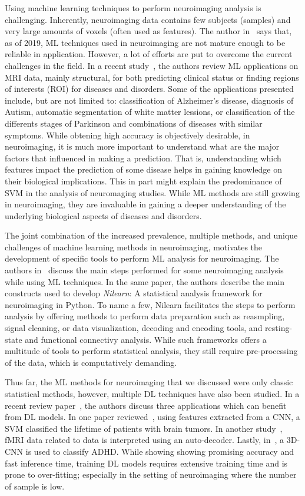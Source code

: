 Using machine learning techniques to perform neuroimaging analysis is challenging.
Inherently, neuroimaging data contains few subjects (samples) and very large amounts
of voxels (often used as features).
The author in~\cite{Davatzikos2019-dc} says that, as of 2019, ML techniques used in
neuroimaging are not mature enough to be reliable in application.
However, a lot of efforts are put to overcome the current challenges in the field.
In a recent study~\cite{Mateos-Perez2018-wx}, the authors review ML applications on MRI data,
mainly structural, for both predicting clinical status or finding regions of interests (ROI)
for diseases and disorders.
Some of the applications presented include, but are not limited to: 
classification of Alzheimer's disease, diagnosis of Autism, automatic segmentation
of white matter lessions, or classification of the differents stages of Parkinson
and combinations of diseases with similar symptoms.
While obtening high accuracy is objectively desirable, in neuroimaging, it is much
more important to understand what are the major factors that influenced in making a prediction.
That is, understanding which features impact the prediction of some disease helps
in gaining knowledge on their biological implications.
This in part might explain the predominance of SVM in the analysis of neuromaging studies.
While ML methods are still growing in neuroimaging, they are invaluable in gaining 
a deeper understanding of the underlying biological aspects of diseases and disorders.

The joint combination of the increased prevalence, multiple methods, and unique 
challenges of machine learning methods in neuroimaging, motivates the development
of specific tools to perform ML analysis for neuroimaging.
The authors in~\cite{Abraham2014-zv} discuss the main steps performed for some 
neuroimaging analysis while using ML techniques.
In the same paper, the authors describe the main constructs used to develop
\textit{Nilearn}: A statistical analysis framework for neuroimaging in Python.
To name a few, Nilearn facilitates the steps to perform analysis by offering 
methods to perform data preparation such as reasmpling, signal cleaning, or data
visualization, decoding and encoding tools, and resting-state and functional connectivy analysis.
While such frameworks offers a multitude of tools to perform statistical analysis,
they still require pre-processing of the data, which is computatively demanding.

Thus far, the ML methods for neuroimaging that we discussed were only classic 
statistical methods, however, multiple DL techniques have also been studied.
In a recent review paper~\cite{Wen2018-to}, the authors discuss three applications
which can benefit from DL models.
In one paper reviewed~\cite{Nie2016-sw}, using features extracted from a CNN,
a SVM classified the lifetime of patients with brain tumors.
In another study~\cite{Wen2018-xm}, fMRI data related to data is interpreted using an auto-decoder.
Lastly, in~\cite{Zou2017-hd}, a 3D-CNN is used to classify ADHD.
While showing showing promising accuracy and fast inference time, training DL models
requires extensive training time and is prone to over-fitting; especially in the
setting of neuroimaging where the number of sample is low.

